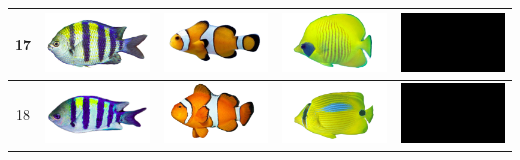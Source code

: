 \begin{longtable}{|c|c|c|c|c|}
    17 & \includegraphics[width=3cm]{gambar/abudefduf/A17} & \includegraphics[width=3cm]{gambar/amphiprion/A17} & \includegraphics[width=3cm]{gambar/chaetodon/C17} & \includegraphics[width=3cm]{gambar/negative_examples/N17} \\
    \hline
    18 & \includegraphics[width=3cm]{gambar/abudefduf/A18} & \includegraphics[width=3cm]{gambar/amphiprion/A18} & \includegraphics[width=3cm]{gambar/chaetodon/C18} & \includegraphics[width=3cm]{gambar/negative_examples/N18} \\
    \hline

\end{longtable}
